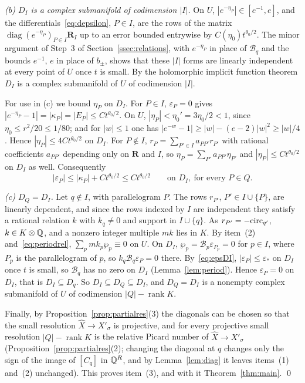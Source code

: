 \emph{(b) $D_I$ is a complex submanifold of codimension $|I|$.} On $U$, $|e^{-\eta_P}|\in[e^{-1},e]$, and the
differentials~\eqref{eq:depsilon}, $P\in I$, are the rows of the matrix $\operatorname{diag}(e^{-\eta_P})_{P\in I}\mathbf R_I$ up to
an error bounded entrywise by $C(\eta_0)t^{\theta_0/2}$. The minor argument of Step~3 of Section~\ref{ssec:relations}, with
$e^{-\eta_P}$ in place of $\mathcal B_q$ and the bounds $e^{-1}$, $e$ in place of $b_\pm$, shows that these $|I|$ forms are
linearly independent at every point of $U$ once $t$ is small. By the holomorphic implicit function theorem $D_I$ is a
complex submanifold of $U$ of codimension $|I|$.

For use in (c) we bound $\eta_P$ on $D_I$. For $P\in I$, $\varepsilon_P=0$ gives $|e^{-\eta_P}-1|=|\kappa_P|=|E_P|\le
Ct^{\theta_0/2}$. On $U$, $|\eta_P|<\eta_0'=3\eta_0/2<1$, since $\eta_0\le r^2/20\le1/80$; and for $|w|\le1$ one has
$|e^{-w}-1|\ge|w|-(e-2)|w|^2\ge|w|/4$. Hence $|\eta_P|\le4Ct^{\theta_0/2}$ on $D_I$. For $P\notin I$,
$r_P=\sum_{P'\in I}a_{PP'}r_{P'}$ with rational coefficients $a_{PP'}$ depending only on $\mathbf R$ and $I$, so
$\eta_P=\sum_{P'}a_{PP'}\eta_{P'}$ and $|\eta_P|\le Ct^{\theta_0/2}$ on $D_I$ as well. Consequently
\begin{equation}\label{eq:epsDI}
|\varepsilon_P|\le|\kappa_P|+Ct^{\theta_0/2}\le Ct^{\theta_0/2}\qquad\text{on }D_I,\ \text{for every }P\in Q .
\end{equation}

\emph{(c) $D_Q=D_I$.} Let $q\notin I$, with parallelogram $P$. The rows $r_{P'}$, $P'\in I\cup\{P\}$, are linearly
dependent, and since the rows indexed by $I$ are independent they satisfy a rational relation $k$ with $k_q\neq0$ and
support in $I\cup\{q\}$. As $r_{P'}=-\mathrm{circ}_{q'}$, $k\in K\otimes\mathbb Q$, and a nonzero integer multiple $mk$ lies in $K$. By
item~(2) and~\eqref{eq:periodrel}, $\sum_{p}mk_p\wp_p\equiv0$ on $U$. On $D_I$, $\wp_p=\mathcal B_p\varepsilon_{P_p}=0$ for
$p\in I$, where $P_p$ is the parallelogram of $p$, so $k_q\mathcal B_q\varepsilon_P=0$ there. By~\eqref{eq:epsDI}, $|\varepsilon_P|\le\varepsilon_*$ on $D_I$ once $t$ is
small, so $\mathcal B_q$ has no zero on $D_I$ (Lemma~\ref{lem:period}). Hence $\varepsilon_P=0$ on $D_I$, that is
$D_I\subseteq D_q$. So $D_I\subseteq D_Q\subseteq D_I$, and $D_Q=D_I$ is a nonempty complex submanifold of $U$ of
codimension $|Q|-\operatorname{rank}K$.

Finally, by Proposition~\ref{prop:partialres}(3) the diagonals can be chosen so that the small resolution
$\widehat X\to X'_\sigma$ is projective, and for every projective small resolution $|Q|-\operatorname{rank}K$ is the relative
Picard number of $\widehat X\to X'_\sigma$ (Proposition~\ref{prop:partialres}(2); changing the diagonal at $q$ changes only the
sign of the image of $[C_q]$ in $\mathbb Q^R$, and by Lemma~\ref{lem:diag} it leaves items~(1) and~(2) unchanged). This proves item~(3), and with it Theorem~\ref{thm:main}. \qed


